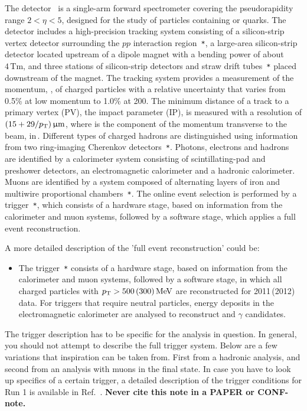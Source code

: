 The \lhcb detector~\cite{Alves:2008zz,LHCb-DP-2014-002} is a single-arm forward
spectrometer covering the \mbox{pseudorapidity} range $2<\eta <5$,
designed for the study of particles containing \bquark or \cquark
quarks. The detector includes a high-precision tracking system
consisting of a silicon-strip vertex detector surrounding the $pp$
interaction region~\cite{LHCb-DP-2014-001}\verb!*!, a large-area silicon-strip detector located
upstream of a dipole magnet with a bending power of about
$4{\mathrm{\,Tm}}$, and three stations of silicon-strip detectors and straw
drift tubes~\cite{LHCb-DP-2013-003}\verb!*! placed downstream of the magnet.
The tracking system provides a measurement of the momentum, \ptot, of charged particles with
a relative uncertainty that varies from 0.5\% at low momentum to 1.0\% at 200\gevc.
The minimum distance of a track to a primary vertex (PV), the impact parameter (IP), 
is measured with a resolution of $(15+29/p_{\mathrm{ T}}){\,\upmu\mathrm{m}}$,
where \pt is the component of the momentum transverse to the beam, in\,\gevc.
Different types of charged hadrons are distinguished using information
from two ring-imaging Cherenkov detectors~\cite{LHCb-DP-2012-003}\verb!*!. 
Photons, electrons and hadrons are identified by a calorimeter system consisting of
scintillating-pad and preshower detectors, an electromagnetic
calorimeter and a hadronic calorimeter. Muons are identified by a
system composed of alternating layers of iron and multiwire
proportional chambers~\cite{LHCb-DP-2012-002}\verb!*!.
The online event selection is performed by a trigger~\cite{LHCb-DP-2012-004}\verb!*!, 
which consists of a hardware stage, based on information from the calorimeter and muon
systems, followed by a software stage, which applies a full event
reconstruction.

A more detailed description of the 'full event reconstruction' could be:
\begin{itemize}
\item The trigger~\cite{LHCb-DP-2012-004}\verb!*! consists of a
hardware stage, based on information from the calorimeter and muon
systems, followed by a software stage, in which all charged particles
with $p_{\mathrm{ T}}>500\,(300)\mathrm{\,Me\kern -0.1em V}$ are reconstructed for 2011\,(2012) data.
For triggers that require neutral particles, 
energy deposits in the electromagnetic calorimeter are 
analysed to reconstruct \piz and $\gamma$ candidates.
\end{itemize}

The trigger description has to be specific for the analysis in
question. In general, you should not attempt to describe the full
trigger system. Below are a few variations that inspiration can be
taken from. First from a hadronic analysis, and second from an
analysis with muons in the final state. In case you have to look 
up specifics of a certain trigger, a detailed description of the trigger 
conditions for Run 1 is available in Ref.~\cite{LHCb-PUB-2014-046}. 
{\bf Never cite this note in a PAPER or CONF-note.} 


